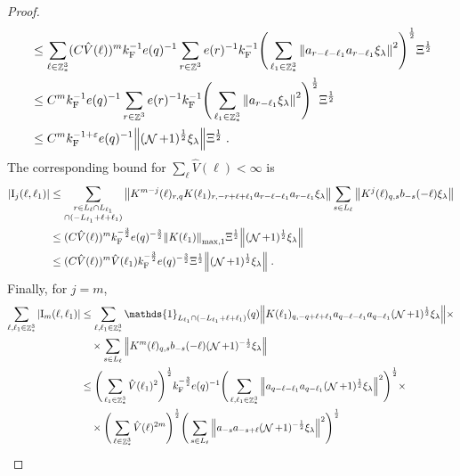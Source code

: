 \documentclass[12pt,a4paper]{article}
\numberwithin{equation}{section}
\newcommand{\1}{\mathbb{I}}
\newcommand{\F}{\mathrm{F}}
\newcommand{\I}{\mathrm{I}}
\DeclareMathOperator{\Z}{\mathbb{Z}}
\DeclareMathOperator{\NN}{\mathcal{N}}
\newcommand{\half}{\frac{1}{2}}
\theoremstyle{plain}
\theoremstyle{definition}
\theoremstyle{remark}
\theoremstyle{plain}
\theoremstyle{definition}
\theoremstyle{remark}
\begin{document}
\begin{proof}
{\begin{align}
	&\leq \sum_{\ell \in \Z^3_*} (C \hat{V}(\ell))^m k_{\F}^{-1} e(q)^{-1}
		\sum_{r \in \Z^3} e(r)^{-1} k_{\F}^{-1}
		\Bigg( \sum_{\ell_1 \in \Z^3_*} \norm{ a_{r-\ell-\ell_1} a_{r-\ell_1} \xi_\lambda}^2 \Bigg)^{\half}
		\Xi^\half \nonumber\\
	&\leq C^m k_{\F}^{-1} e(q)^{-1}
		\sum_{r \in \Z^3} e(r)^{-1} k_{\F}^{-1}
		\Bigg( \sum_{\ell_1 \in \Z^3_*} \norm{ a_{r-\ell_1} \xi_\lambda}^2 \Bigg)^{\half}
		\Xi^\half \nonumber\\
	&\leq C^m k_{\F}^{-1+\varepsilon} e(q)^{-1}
		\norm{ (\NN+1)^{\half} \xi_\lambda}
		\Xi^\half \;. \label{eq:estEQ2152_Coulomb}
\end{align}
The corresponding bound for $ \sum_\ell \hat{V}(\ell) < \infty $ is}
\begin{align}
	|\I_j(\ell, \ell_1)|
	&\leq \sum\limits_{\substack{r\in L_{\ell} \cap L_{\ell_1}\\ \cap (-L_{\ell_1}+\ell+\ell_1)}}
		\norm{ K^{m-j}(\ell)_{r,q} K(\ell_1)_{r,-r+\ell+\ell_1} a_{r-\ell-\ell_1} a_{r-\ell_1} \xi_\lambda}
		\sum\limits_{s \in L_{\ell}}
		\norm{ K^j(\ell)_{q,s} b_{-s}(-\ell) \xi_\lambda }\nonumber\\
	&\leq (C \hat{V}(\ell))^m k_{\F}^{-\frac 32} e(q)^{-\frac 32}
		\norm{K(\ell_1)}_{\max,1} \Xi^{\half}
		\norm{ (\NN+1)^\half \xi_\lambda} \nonumber\\
	&\leq (C \hat{V}(\ell))^m
		\hat{V}(\ell_1)
		k_{\F}^{-\frac 32} e(q)^{-\frac 32} \Xi^\half
		\norm{ (\NN+1)^\half \xi_\lambda} \;. \label{eq:estEQ2152}
\end{align}
Finally, for $ j = m $,
\textcolor{green!30!black}{
\begin{align}
	\sum_{\ell,\ell_1 \in \Z^3_*} |\I_m(\ell, \ell_1)|
	&\leq \sum_{\ell,\ell_1 \in \Z^3_*} \mathds{1}_{L_{\ell_1} \cap (-L_{\ell_1} + \ell + \ell_1)}(q) \norm{K(\ell_1)_{q,-q+\ell+\ell_1} a_{q-\ell-\ell_1} a_{q-\ell_1} (\NN+1)^{\half} \xi_\lambda} \times \nonumber\\
	&\quad \times \sum\limits_{ s \in L_{\ell}}
		\norm{ K^m(\ell)_{q,s} b_{-s}(-\ell) (\NN+1)^{-\half} \xi_\lambda }\nonumber\\
	&\leq \Bigg( \sum_{\ell_1 \in \Z^3_*} \hat{V}(\ell_1)^2 \Bigg)^{\half} 
		k_{\F}^{-\frac 32} e(q)^{-1}
		\Bigg( \sum_{\ell,\ell_1 \in \Z^3_*} \norm{a_{q-\ell-\ell_1} a_{q-\ell_1} (\NN+1)^{\half} \xi_\lambda}^2 \Bigg)^{\half} \times \nonumber\\
	&\quad \times \Bigg( \sum_{\ell \in \Z^3_*} \hat{V}(\ell)^{2m} \Bigg)^{\half} 
		\Bigg( \sum\limits_{ s \in L_{\ell}} \norm{ a_{-s} a_{-s+\ell} (\NN+1)^{-\half} \xi_\lambda }^2 \Bigg)^{\half} \nonumber\\

\end{align}}
\end{proof}
\end{document}
